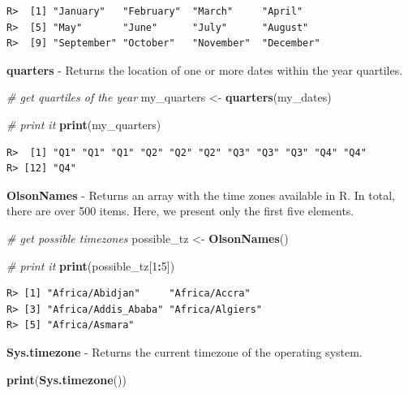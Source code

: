\documentclass[
  12pt,
]{book}
\newenvironment{Shaded}{\begin{snugshade}}{\end{snugshade}}
\newcommand{\CommentTok}[1]{\textcolor[rgb]{0.37,0.37,0.37}{\textit{#1}}}
\newcommand{\DecValTok}[1]{\textcolor[rgb]{0.06,0.06,0.06}{#1}}
\newcommand{\KeywordTok}[1]{\textcolor[rgb]{0.27,0.27,0.27}{\textbf{#1}}}
\newcommand{\NormalTok}[1]{#1}
\newcommand{\OperatorTok}[1]{\textcolor[rgb]{0.43,0.43,0.43}{\textbf{#1}}}
\newcommand{\StringTok}[1]{\textcolor[rgb]{0.5,0.5,0.5}{#1}}
\begin{document}
\begin{verbatim}
R>  [1] "January"   "February"  "March"     "April"    
R>  [5] "May"       "June"      "July"      "August"   
R>  [9] "September" "October"   "November"  "December"
\end{verbatim}

\textbf{quarters} - Returns the location of one or more dates within the year quartiles. 

\begin{Shaded}
\begin{Highlighting}[]
\CommentTok{# get quartiles of the year}
\NormalTok{my_quarters <-}\StringTok{ }\KeywordTok{quarters}\NormalTok{(my_dates)}

\CommentTok{# print it}
\KeywordTok{print}\NormalTok{(my_quarters)}
\end{Highlighting}
\end{Shaded}

\begin{verbatim}
R>  [1] "Q1" "Q1" "Q1" "Q2" "Q2" "Q2" "Q3" "Q3" "Q3" "Q4" "Q4"
R> [12] "Q4"
\end{verbatim}

\textbf{OlsonNames} - Returns an array with the time zones available in R. In total, there are over 500 items. Here, we present only the first five elements. 

\begin{Shaded}
\begin{Highlighting}[]
\CommentTok{# get possible timezones}
\NormalTok{possible_tz <-}\StringTok{ }\KeywordTok{OlsonNames}\NormalTok{()}

\CommentTok{# print it}
\KeywordTok{print}\NormalTok{(possible_tz[}\DecValTok{1}\OperatorTok{:}\DecValTok{5}\NormalTok{])}
\end{Highlighting}
\end{Shaded}

\begin{verbatim}
R> [1] "Africa/Abidjan"     "Africa/Accra"      
R> [3] "Africa/Addis_Ababa" "Africa/Algiers"    
R> [5] "Africa/Asmara"
\end{verbatim}

\textbf{Sys.timezone} - Returns the current timezone of the operating system. 

\begin{Shaded}
\begin{Highlighting}[]
\KeywordTok{print}\NormalTok{(}\KeywordTok{Sys.timezone}\NormalTok{())}
\end{Highlighting}
\end{Shaded}
\end{document}
